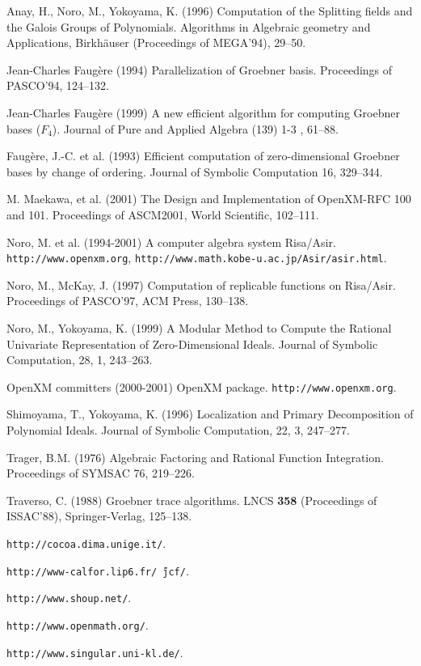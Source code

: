 \documentclass[runningheads]{cl2emult}
\begin{document}
\begin{thebibliography}{7}
%

Anay, H., Noro, M., Yokoyama, K. (1996)
Computation of the Splitting fields and the Galois Groups of Polynomials.
Algorithms in Algebraic geometry and Applications, 
Birkh\"auser (Proceedings of MEGA'94), 29--50.

Jean-Charles Faug\`ere (1994)
Parallelization of Groebner basis.
Proceedings of PASCO'94, 124--132.

Jean-Charles Faug\`ere (1999)
A new efficient algorithm for computing Groebner bases  ($F_4$).
Journal of Pure and Applied Algebra (139) 1-3 , 61--88.

Faug\`ere, J.-C. et al. (1993)
Efficient computation of zero-dimensional Groebner bases by change of ordering.
Journal of Symbolic Computation 16, 329--344.

M. Maekawa, et al. (2001)
The Design and Implementation of OpenXM-RFC 100 and 101.
Proceedings of ASCM2001, World Scientific, 102--111.

Noro, M. et al. (1994-2001)
A computer algebra system Risa/Asir.
{\tt http://www.openxm.org}, {\tt http://www.math.kobe-u.ac.jp/Asir/asir.html}.

Noro, M., McKay, J. (1997)
Computation of replicable functions on Risa/Asir.
Proceedings of PASCO'97, ACM Press, 130--138.

Noro, M., Yokoyama, K. (1999)
A Modular Method to Compute the Rational Univariate
Representation of Zero-Dimensional Ideals.
Journal of Symbolic Computation, 28, 1, 243--263.

OpenXM committers (2000-2001)
OpenXM package.
{\tt http://www.openxm.org}.

Shimoyama, T., Yokoyama, K. (1996)
Localization and Primary Decomposition of Polynomial Ideals.
Journal of Symbolic Computation, 22, 3, 247--277.

Trager, B.M. (1976)
Algebraic Factoring and Rational Function Integration.
Proceedings of SYMSAC 76, 219--226.

Traverso, C. (1988)
Groebner trace algorithms.
LNCS {\bf 358} (Proceedings of ISSAC'88), Springer-Verlag, 125--138.

{\tt http://cocoa.dima.unige.it/}.

{\tt http://www-calfor.lip6.fr/\~\,jcf/}.

{\tt http://www.shoup.net/}.

{\tt http://www.openmath.org/}.

{\tt http://www.singular.uni-kl.de/}.

\end{thebibliography}

\clearpage
{}
\flushbottom
\printindex
\end{document}
